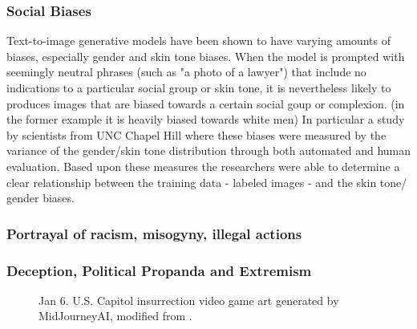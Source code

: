 \documentclass[9pt,twocolumn,twoside]{osajnl}
\begin{document}
\subsubsection*{Social Biases}
Text-to-image generative models have been shown to have varying amounts of biases, especially gender and skin tone biases. 
When the model is prompted with seemingly neutral phrases (such as "a photo of a lawyer") that include no indications to a particular social group or skin tone, it is nevertheless likely to produces images that are biased towards a certain social goup or complexion. (in the former example it is heavily biased towards white men) 
In particular a study by scientists from UNC Chapel Hill where these biases were measured by the variance of the gender/skin tone distribution through both automated and human evaluation. 
Based upon these measures the researchers were able to determine a clear relationship between the training data - labeled images - and the skin tone/ gender biases\cite{DallEval}. 


\subsubsection*{Portrayal of racism, misogyny, illegal actions}
\subsubsection*{Deception, Political Propanda and Extremism}
\begin{figure}[htbp]
	\centering
	\caption{Jan 6. U.S. Capitol insurrection video game art generated by MidJourneyAI, modified from \cite{AIPropaganda}.}
\end{figure}
\end{document}
